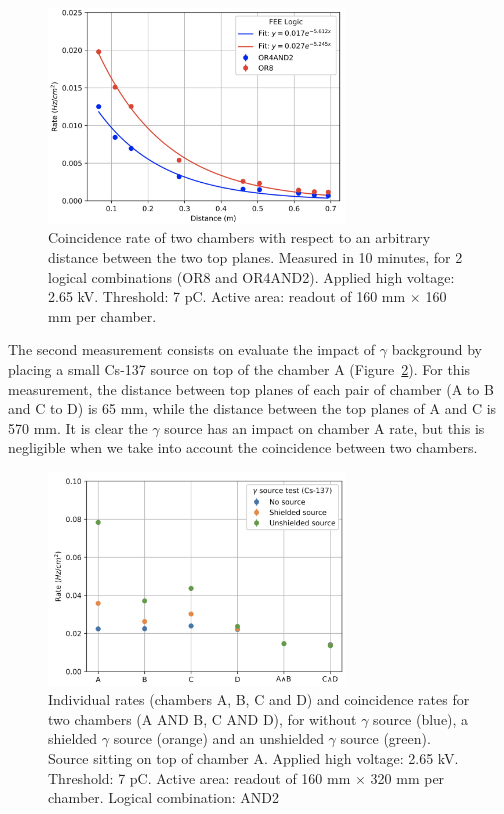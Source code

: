 \begin{figure}[h]
\begin{center}
\includegraphics[width=0.7\textwidth,keepaspectratio]{figures_and_tables/rpc/mwpc/coincidence.png}
\end{center}
\caption{Coincidence rate of two chambers with respect to an arbitrary distance between the two top planes. Measured in 10 minutes, for 2 logical combinations (OR8 and OR4AND2). Applied high voltage: 2.65 kV. Threshold: 7 pC. Active area: readout of 160 mm $\times$ 160 mm per chamber.}
\label{coincidence}
\end{figure}

The second measurement consists on evaluate the impact of $\gamma$ background by placing a small Cs-137 source on top of the chamber A (Figure~\ref{gamma}). For this measurement, the distance between top planes of each pair of chamber (A to B and C to D) is 65 mm, while the distance between the top planes of A and C is 570 mm. It is clear the $\gamma$ source has an impact on chamber A rate, but this is negligible when we take into account the coincidence between two chambers.

\begin{figure}[h]
\begin{center}
\includegraphics[width=0.7\textwidth,keepaspectratio]{figures_and_tables/rpc/mwpc/gamma.png}
\end{center}
\caption{Individual rates (chambers A, B, C and D) and coincidence rates for two chambers (A AND B, C AND D), for without $\gamma$ source (blue), a shielded $\gamma$ source (orange) and an unshielded $\gamma$ source (green). Source sitting on top of chamber A. Applied high voltage: 2.65 kV. Threshold: 7 pC. Active area: readout of 160 mm $\times$ 320 mm per chamber. Logical combination: AND2}
\label{gamma}
\end{figure}

